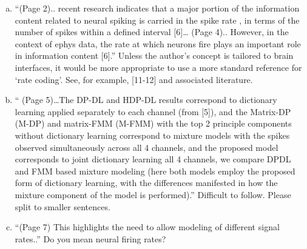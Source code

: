 \begin{enumerate}[a.]
	\item “(Page 2).. recent research indicates that a major portion of the information content related to neural spiking is carried in the spike rate , in terms of the number of spikes within a defined interval [6]… (Page 4).. However, in the context of ephys data, the rate at which neurons fire plays an important role in information content [6].”
	Unless the author’s concept is tailored to brain interfaces, it would be more appropriate to use a more standard reference for ‘rate coding’. See, for example, [11-12] and associated literature.
	
	
	\item “ (Page 5)…The DP-DL and HDP-DL results correspond to dictionary learning applied separately to each channel (from [5]), and the Matrix-DP (M-DP) and matrix-FMM (M-FMM) with the top 2 principle components without dictionary learning correspond to mixture models with the spikes observed simultaneously across all 4 channels, and the proposed model corresponds to joint dictionary learning all 4 channels, we compare DPDL and FMM based mixture modeling (here both models employ the proposed form of dictionary learning, with the differences manifested in how the mixture component of the model is performed).”
	Difficult to follow. Please split to smaller sentences.
	
	
	\item “(Page 7) This highlights the need to allow modeling of different signal rates..”
	Do you mean neural firing rates?
	
\end{enumerate}











% 








